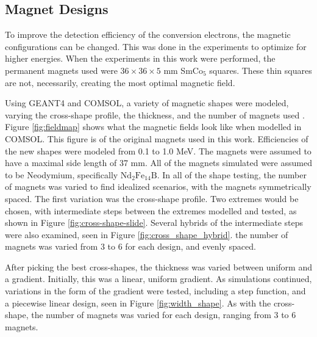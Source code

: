 

\subsection{Magnet Designs}

To improve the detection efficiency of the conversion electrons, the magnetic configurations can be changed. This was done in the experiments to optimize for higher energies. When the experiments in this work were performed, the permanent magnets used were $36\times36\times5$ mm SmCo$_5$ squares. These thin squares are not, necessarily, creating the most optimal magnetic field.

Using GEANT4 and COMSOL, a variety of magnetic shapes were modeled, varying the cross-shape profile, the thickness, and the number of magnets used \citep{allison16:_geant4,comsol:_comsol}. Figure \ref{fig:fieldmap} shows what the magnetic fields look like when modelled in COMSOL. This figure is of the original magnets used in this work. Efficiencies of the new shapes were modeled from 0.1 to 1.0 MeV. The magnets were assumed to have a maximal side length of 37 mm. All of the magnets simulated were assumed to be Neodymium, specifically $\text{Nd}_{2}\text{Fe}_{14}\text{B}$.  In all of the shape testing, the number of magnets was varied to find idealized scenarios, with the magnets symmetrically spaced. The first variation was the cross-shape profile. Two extremes would be chosen, with intermediate steps between the extremes modelled and tested, as shown in Figure \ref{fig:cross-shape-slide}. Several hybrids of the intermediate steps were also examined, seen in Figure \ref{fig:cross_shape_hybrid}. the number of magnets was varied from 3 to 6 for each design, and evenly spaced.







After picking the best cross-shapes, the thickness was varied between uniform and a gradient. Initially, this was a linear, uniform gradient. As simulations continued, variations in the form of the gradient were tested, including a step function, and a piecewise linear design, seen in Figure \ref{fig:width_shape}. As with the cross-shape, the number of magnets was varied for each design, ranging from 3 to 6 magnets.



